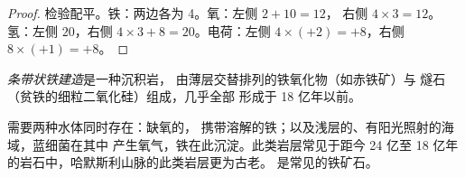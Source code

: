 \begin{proof}
检验配平。铁：两边各为 4。氧：左侧 $2 + 10 = 12$，
右侧 $4 \times 3 = 12$。氢：左侧 $20$，右侧 $4 \times 3 + 8 =
20$。电荷：左侧 $4 \times (+2) = +8$，右侧 $8 \times (+1) =
+8$。
\end{proof}

\begin{definition}[条带状铁建造]\label{def:g12:early-earth:bif}
\emph{条带状铁建造}是一种沉积岩，
由薄层交替排列的铁氧化物（如赤铁矿）与
燧石（贫铁的细粒二氧化硅）组成，几乎全部
形成于 18 亿年以前。
\end{definition}

需要两种水体同时存在：缺氧的，
携带溶解的铁；以及浅层的、有阳光照射的海域，蓝细菌在其中
产生氧气，铁在此沉淀。此类岩层常见于距今 24 亿至
18 亿年的岩石中，哈默斯利山脉的此类岩层更为古老。
是常见的铁矿石。

